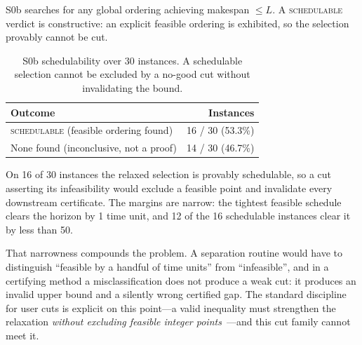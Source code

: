 S0b searches for any global ordering achieving makespan $\le L$. A \textsc{schedulable} verdict is constructive: an explicit feasible ordering is exhibited, so the selection provably cannot be cut.

\begin{table}[htbp]
\centering
\caption{S0b schedulability over 30 instances. A schedulable selection cannot be excluded by a no-good cut without invalidating the bound.}
\label{tab:s0b}
\begin{tabular}{lr}
\toprule
Outcome & Instances \\
\midrule
\textsc{schedulable} (feasible ordering found) & 16 / 30 \;(53.3\%) \\
None found (inconclusive, not a proof) & 14 / 30 \;(46.7\%) \\
\bottomrule
\end{tabular}
\end{table}

On 16 of 30 instances the relaxed selection is provably schedulable, so a cut asserting its infeasibility would exclude a feasible point and invalidate every downstream certificate. The margins are narrow: the tightest feasible schedule clears the horizon by 1 time unit, and 12 of the 16 schedulable instances clear it by less than 50.

That narrowness compounds the problem. A separation routine would have to distinguish ``feasible by a handful of time units'' from ``infeasible'', and in a certifying method a misclassification does not produce a weak cut: it produces an invalid upper bound and a silently wrong certified gap. The standard discipline for user cuts is explicit on this point---a valid inequality must strengthen the relaxation \emph{without excluding feasible integer points}~\cite{Crowder1983ZeroOne,Barnhart1998BranchPrice}---and this cut family cannot meet it.

